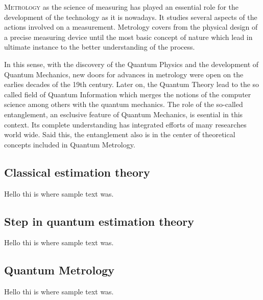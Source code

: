 
\lettrine[lines=2, findent=3pt,nindent=0pt]{M}{etrology} as the science of measuring has played an essential role for the development of the technology as it is nowadays.
It studies several aspects of the actions involved on a measurement. 
Metrology covers from the physical design of a precise measuring device until the most basic concept of nature which lead in ultimate instance to the better understanding of the process. 

In this sense, with the discovery of the Quantum Physics and the development of Quantum Mechanics, new doors for advances in metrology were open on the earlies decades of the 19th century.
Later on, the Quantum Theory lead to the so called field of Quantum Information which merges the notions of the computer science among others with the quantum mechanics.
The role of the so-called entanglement, an esclusive feature of Quantum Mechanics, is esential in this context.
Its complete understanding has integrated efforts of many researches world wide.
Said this, the entanglement also is in the center of theoretical concepts included in Quantum Metrology.

\subsection{Classical estimation theory}
Hello thi is where sample text was.

\subsection{Step in quantum estimation theory}
Hello thi is where sample text was.

\subsection{Quantum Metrology}
Hello thi is where sample text was.